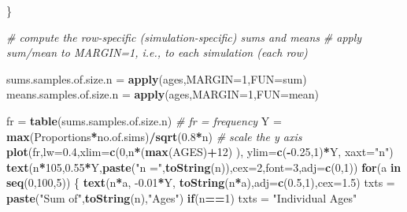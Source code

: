 \documentclass[
]{article}
\newenvironment{Shaded}{\begin{snugshade}}{\end{snugshade}}
\newcommand{\CommentTok}[1]{\textcolor[rgb]{0.56,0.35,0.01}{\textit{#1}}}
\newcommand{\ControlFlowTok}[1]{\textcolor[rgb]{0.13,0.29,0.53}{\textbf{#1}}}
\newcommand{\DataTypeTok}[1]{\textcolor[rgb]{0.13,0.29,0.53}{#1}}
\newcommand{\DecValTok}[1]{\textcolor[rgb]{0.00,0.00,0.81}{#1}}
\newcommand{\FloatTok}[1]{\textcolor[rgb]{0.00,0.00,0.81}{#1}}
\newcommand{\KeywordTok}[1]{\textcolor[rgb]{0.13,0.29,0.53}{\textbf{#1}}}
\newcommand{\NormalTok}[1]{#1}
\newcommand{\OperatorTok}[1]{\textcolor[rgb]{0.81,0.36,0.00}{\textbf{#1}}}
\newcommand{\StringTok}[1]{\textcolor[rgb]{0.31,0.60,0.02}{#1}}
\begin{document}
\begin{Shaded}
\begin{Highlighting}[]
\NormalTok{   \} }
  
   \CommentTok{# compute the row-specific (simulation-specific) sums and means}
   \CommentTok{# apply sum/mean to MARGIN=1, i.e., to each simulation (each row)}

\NormalTok{   sums.samples.of.size.n =}\StringTok{ }\KeywordTok{apply}\NormalTok{(ages,}\DataTypeTok{MARGIN=}\DecValTok{1}\NormalTok{,}\DataTypeTok{FUN=}\NormalTok{sum)}
\NormalTok{   means.samples.of.size.n =}\StringTok{ }\KeywordTok{apply}\NormalTok{(ages,}\DataTypeTok{MARGIN=}\DecValTok{1}\NormalTok{,}\DataTypeTok{FUN=}\NormalTok{mean)}

\NormalTok{   fr =}\StringTok{ }\KeywordTok{table}\NormalTok{(sums.samples.of.size.n)          }\CommentTok{# fr = frequency}
\NormalTok{   Y =}\StringTok{ }\KeywordTok{max}\NormalTok{(Proportions}\OperatorTok{*}\NormalTok{no.of.sims)}\OperatorTok{/}\KeywordTok{sqrt}\NormalTok{(}\FloatTok{0.8}\OperatorTok{*}\NormalTok{n) }\CommentTok{# scale the y axis}
   \KeywordTok{plot}\NormalTok{(fr,}\DataTypeTok{lw=}\FloatTok{0.4}\NormalTok{,}\DataTypeTok{xlim=}\KeywordTok{c}\NormalTok{(}\DecValTok{0}\NormalTok{,n}\OperatorTok{*}\NormalTok{(}\KeywordTok{max}\NormalTok{(AGES)}\OperatorTok{+}\DecValTok{12}\NormalTok{) ), }
                  \DataTypeTok{ylim=}\KeywordTok{c}\NormalTok{(}\OperatorTok{-}\FloatTok{0.25}\NormalTok{,}\DecValTok{1}\NormalTok{)}\OperatorTok{*}\NormalTok{Y, }\DataTypeTok{xaxt=}\StringTok{"n"}\NormalTok{)}
   \KeywordTok{text}\NormalTok{(n}\OperatorTok{*}\DecValTok{105}\NormalTok{,}\FloatTok{0.55}\OperatorTok{*}\NormalTok{Y,}\KeywordTok{paste}\NormalTok{(}\StringTok{"n ="}\NormalTok{,}\KeywordTok{toString}\NormalTok{(n)),}\DataTypeTok{cex=}\DecValTok{2}\NormalTok{,}\DataTypeTok{font=}\DecValTok{3}\NormalTok{,}\DataTypeTok{adj=}\KeywordTok{c}\NormalTok{(}\DecValTok{0}\NormalTok{,}\DecValTok{1}\NormalTok{))}
   \ControlFlowTok{for}\NormalTok{(a }\ControlFlowTok{in} \KeywordTok{seq}\NormalTok{(}\DecValTok{0}\NormalTok{,}\DecValTok{100}\NormalTok{,}\DecValTok{5}\NormalTok{)) \{}
     \KeywordTok{text}\NormalTok{(n}\OperatorTok{*}\NormalTok{a, }\FloatTok{-0.01}\OperatorTok{*}\NormalTok{Y, }\KeywordTok{toString}\NormalTok{(n}\OperatorTok{*}\NormalTok{a),}\DataTypeTok{adj=}\KeywordTok{c}\NormalTok{(}\FloatTok{0.5}\NormalTok{,}\DecValTok{1}\NormalTok{),}\DataTypeTok{cex=}\FloatTok{1.5}\NormalTok{)}
\NormalTok{     txts =}\StringTok{ }\KeywordTok{paste}\NormalTok{(}\StringTok{"Sum of"}\NormalTok{,}\KeywordTok{toString}\NormalTok{(n),}\StringTok{"Ages"}\NormalTok{)}
     \ControlFlowTok{if}\NormalTok{(n}\OperatorTok{==}\DecValTok{1}\NormalTok{) txts =}\StringTok{ "Individual Ages"}

\end{Highlighting}
\end{Shaded}
\end{document}
